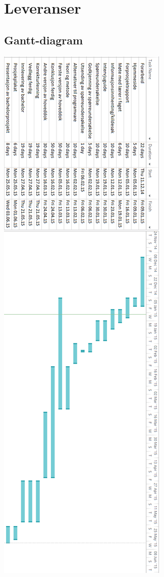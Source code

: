 \documentclass[norsk,a4paper,12pt]{article}
\begin{document}
\section{Leveranser}

\subsection{Gantt-diagram}

\begin{center}
\includegraphics[scale=0.5]{gantt.png}
\end{center}
\end{document}
